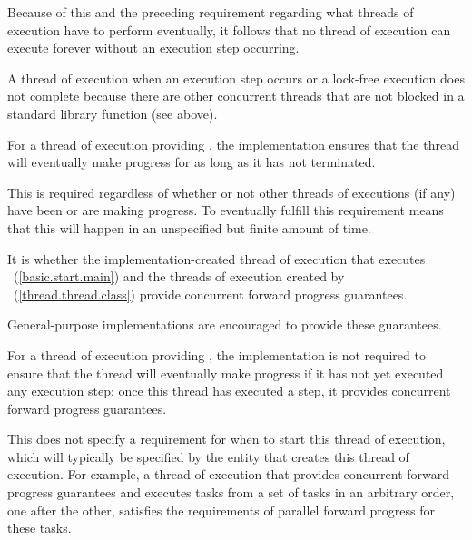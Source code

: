 \pnum
\begin{note}
Because of this and the preceding requirement regarding what threads of execution
have to perform eventually, it follows that no thread of execution can execute
forever without an execution step occurring.
\end{note}

\pnum
A thread of execution 
when an execution step occurs or a
lock-free execution does not complete because there are other concurrent threads
that are not blocked in a standard library function (see above).

\pnum
{}%
For a thread of execution providing ,
the implementation ensures that the thread will eventually make progress for as
long as it has not terminated.
\begin{note}
This is required regardless of whether or not other threads of executions (if any)
have been or are making progress. To eventually fulfill this requirement means that
this will happen in an unspecified but finite amount of time.
\end{note}

\pnum
It is  whether the
implementation-created thread of execution that executes
~(\ref{basic.start.main}) and the threads of execution created by
~(\ref{thread.thread.class}) provide concurrent forward progress
guarantees.
\begin{note}
General-purpose implementations are encouraged to provide these guarantees.
\end{note}

\pnum
{}%
For a thread of execution providing ,
the implementation is not required to ensure that the thread will eventually make
progress if it has not yet executed any execution step; once this thread has
executed a step, it provides concurrent forward progress guarantees.

\pnum
\begin{note}
This does not specify a requirement for when to start this thread of execution,
which will typically be specified by the entity that creates this thread of
execution. For example, a thread of execution that provides concurrent forward
progress guarantees and executes tasks from a set of tasks in an arbitrary order,
one after the other, satisfies the requirements of parallel forward progress for
these tasks.
\end{note}

